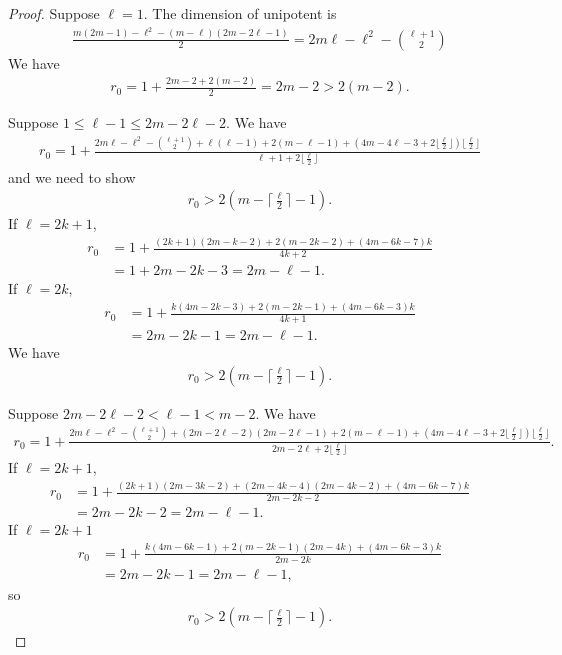 \documentclass[11pt,a4paper,usenames,dvipsnames,reqno]{amsart}
\numberwithin{equation}{section}
\theoremstyle{definition}
\theoremstyle{remark}
\begin{document}
{\begin{proof}
Suppose $\ell=1$. The dimension of unipotent is
\begin{align*}
    \frac{m(2m-1)-\ell^2-(m-\ell)(2m-2\ell-1)}{2}=2m\ell-\ell^2-\binom{\ell+1}{2}
\end{align*}
We have
\begin{align*}
    r_0=1+\frac{2m-2+2(m-2)}{2}=2m-2>2(m-2).
\end{align*}

Suppose $1\le \ell-1\le 2m-2\ell-2.$ We have
\begin{align*}
    r_0=1+\frac{2m\ell-\ell^2-\binom{\ell+1}{2}+\ell(\ell-1)+2(m-\ell-1)+(4m-4\ell-3+2\lfloor\frac{\ell}{2}\rfloor)\lfloor \frac{\ell}{2}\rfloor }{\ell+1+2\lfloor \frac{\ell}{2}\rfloor }
\end{align*}
and we need to show
\begin{align*}
    r_0>2(m-\lceil\frac{\ell}{2} \rceil-1).
\end{align*}
If $\ell=2k+1$, 
\begin{align*}
    r_0&=1+\frac{(2k+1)(2m-k-2)+2(m-2k-2)+(4m-6k-7)k}{4k+2}\\
    &=1+2m-2k-3=2m-\ell-1.
\end{align*}
If $\ell=2k,$
\begin{align*}
    r_0&=1+\frac{k(4m-2k-3)+2(m-2k-1)+(4m-6k-3)k}{4k+1}\\
    &=2m-2k-1=2m-\ell-1.
\end{align*}
We have
\begin{align*}
    r_0>2(m-\lceil\frac{\ell}{2} \rceil-1).
\end{align*}

Suppose $2m-2\ell-2<\ell-1<m-2$. We have
\begin{align*}
    r_0=1+\frac{2m\ell-\ell^2-\binom{\ell+1}{2}+(2m-2\ell-2)(2m-2\ell-1)+2(m-\ell-1)+(4m-4\ell-3+2\lfloor\frac{\ell}{2}\rfloor)\lfloor \frac{\ell}{2}\rfloor }{2m-2\ell+2\lfloor \frac{\ell}{2}\rfloor }.
\end{align*}
If $\ell=2k+1$,
\begin{align*}
     r_0&=1+\frac{(2k+1)(2m-3k-2)+(2m-4k-4)(2m-4k-2)+(4m-6k-7)k}{2m-2k-2}\\
    &=2m-2k-2=2m-\ell-1.
\end{align*}
If $\ell=2k+1$
\begin{align*}
    r_0&=1+\frac{k(4m-6k-1)+2(m-2k-1)(2m-4k)+(4m-6k-3)k}{2m-2k}\\
    &=2m-2k-1=2m-\ell-1,
\end{align*}
so
\begin{align*}
    r_0>2(m-\lceil\frac{\ell}{2} \rceil-1).
\end{align*}


\end{proof}}
\end{document}
